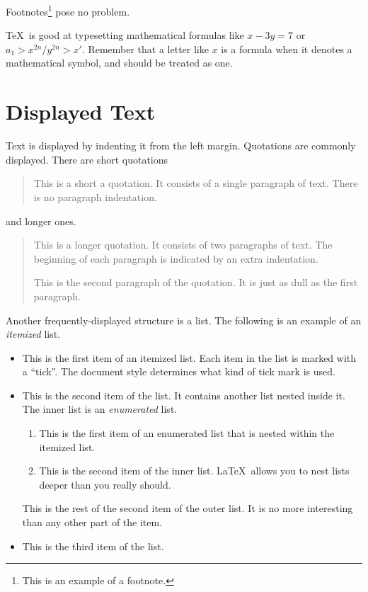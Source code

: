 Footnotes\footnote{This is an example of a footnote.} 
pose no problem.

\TeX\ is good at typesetting mathematical formulas like 
       \( x-3y = 7 \) 
or 
       \( a_{1} > x^{2n} / y^{2n} > x' \). 
Remember that a letter like 
       $x$        %
is a formula when it denotes a mathematical symbol, and should 
be treated as one.

\section{Displayed Text}

Text is displayed by indenting it from the left margin. 
Quotations are commonly displayed.  There are short quotations 
\begin{quote} 
   This is a short a quotation.  It consists of a 
   single paragraph of text.  There is no paragraph 
   indentation. 
\end{quote} 
and longer ones. 
\begin{quotation} 
   This is a longer quotation.  It consists of two paragraphs 
   of text.  The beginning of each paragraph is indicated 
   by an extra indentation.

   This is the second paragraph of the quotation.  It is just 
   as dull as the first paragraph. 
\end{quotation} 
Another frequently-displayed structure is a list. 
The following is an example of an {\em itemized} list. 
\begin{itemize} 
   \item  This is the first item of an itemized list.  Each item 
          in the list is marked with a ``tick''.  The document 
          style determines what kind of tick mark is used.

   \item  This is the second item of the list.  It contains another 
          list nested inside it.  The inner list is an {\em enumerated} 
          list. 
          \begin{enumerate} 
              \item This is the first item of an enumerated list that 
                    is nested within the itemized list.

              \item This is the second item of the inner list.  \LaTeX\ 
                    allows you to nest lists deeper than you really should. 
          \end{enumerate} 
          This is the rest of the second item of the outer list.  It 
          is no more interesting than any other part of the item. 
   \item  This is the third item of the list. 
\end{itemize} 
